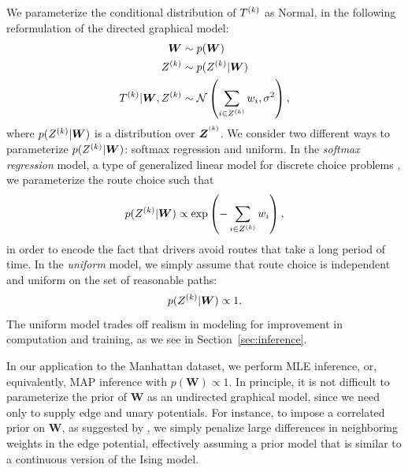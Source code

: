 \documentclass{article}
\begin{document}
We parameterize the conditional distribution of $T^{(k)}$ as Normal, in the following reformulation of the directed graphical model: \begin{align*}
\bm W &\sim p(\bm W) \\
Z^{(k)} &\sim p(Z^{(k)} | \bm W) \\
T^{(k)} | \bm W, Z^{(k)} &\sim \mathcal{N}\left({\sum_{i\in Z^{(k)}} w_i, \sigma^2}\right),
\end{align*}
where $p(Z^{(k)} | \bm W)$ is a distribution over $\bm Z^{^{(k)}}$. We consider two different ways to parameterize $p(Z^{(k)} | \bm W)$: softmax regression and uniform. In the \emph{softmax regression} model, a type of generalized linear model for discrete choice problems \cite{mcfadden1973conditional}, we parameterize the route choice such that \[
p(Z^{(k)}|\bm W) \propto \exp\left({-\sum_{i\in Z^{(k)}}w_i}\right),
\]
in order to encode the fact that drivers avoid routes that take a long period of time. In the \emph{uniform} model, we simply assume that route choice is independent and uniform on the set of reasonable paths: \[
p(Z^{(k)}|\bm W) \propto 1.
\]
The uniform model trades off realism in modeling for improvement in computation and training, as we see in Section~\ref{sec:inference}.

In our application to the Manhattan dataset, we perform MLE inference, or, equivalently, MAP inference with $p(\bm W) \propto 1$. In principle, it is not difficult to parameterize the prior of $\bm W$ as an undirected graphical model, since we need only to supply edge and unary potentials. For instance, to impose a correlated prior on $\bm W$, as suggested by \citet*{hunter2009path}, we simply penalize large differences in neighboring weights in the edge potential, effectively assuming a prior model that is similar to a continuous version of the Ising model. 



% 
% 
% 
\end{document}
